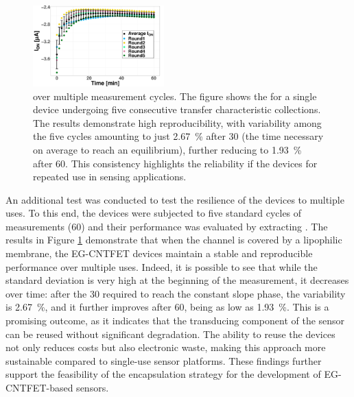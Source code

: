 \begin{figure}
    \centering
    \includegraphics[width=0.45\textwidth]{figures/chapter3/EGFET/repMeas.pdf}
    \caption{\ion{} over multiple measurement cycles. The figure shows the \ion{} for a single device undergoing five consecutive transfer characteristic collections. The results demonstrate high reproducibility, with variability among the five cycles amounting to just \SI{2.67}{\%} after \SI{30}{\min} (the time necessary on average to reach an equilibrium), further reducing to \SI{1.93}{\%} after \SI{60}{\min}. This consistency highlights the reliability if the devices for repeated use in sensing applications.}
    \label{fig:repMeas}
\end{figure}

An additional test was conducted to test the resilience of the devices to multiple uses. To this end, the devices were subjected to five standard cycles of measurements (\SI{60}{\min}) and their performance was evaluated by extracting \ion{}. The results in Figure \ref{fig:repMeas} demonstrate that when the channel is covered by a lipophilic membrane, the EG-CNTFET devices maintain a stable and reproducible performance over multiple uses. Indeed, it is possible to see that while the standard deviation is very high at the beginning of the measurement, it decreases over time: after the \SI{30}{\min} required to reach the constant slope phase, the variability is \SI{2.67}{\%}, and it further improves after \SI{60}{\min}, being as low as \SI{1.93}{\%}. This is a promising outcome, as it indicates that the transducing component of the sensor can be reused without significant degradation. The ability to reuse the devices not only reduces costs but also electronic waste, making this approach more sustainable compared to single-use sensor platforms. These findings further support the feasibility of the encapsulation strategy for the development of EG-CNTFET-based sensors.

